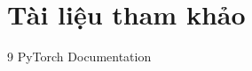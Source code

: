 \section{Tài liệu tham khảo}

\begin{thebibliography}{9}
 PyTorch Documentation
\end{thebibliography}